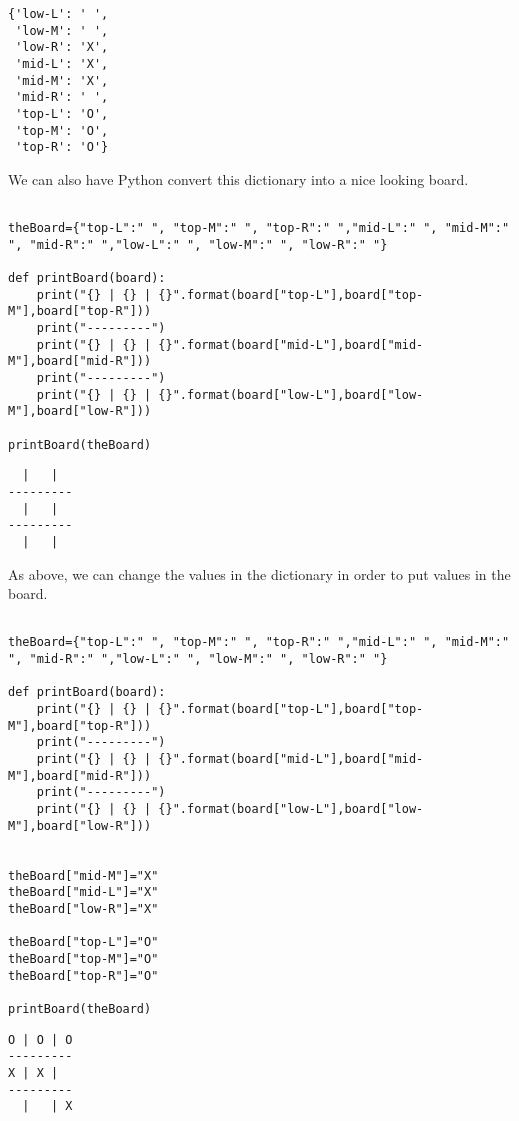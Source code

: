 \documentclass[11pt]{article}
\begin{document}
\begin{verbatim}
{'low-L': ' ',
 'low-M': ' ',
 'low-R': 'X',
 'mid-L': 'X',
 'mid-M': 'X',
 'mid-R': ' ',
 'top-L': 'O',
 'top-M': 'O',
 'top-R': 'O'}
\end{verbatim}


We can also have Python convert this dictionary into a nice looking board.


\begin{verbatim}

theBoard={"top-L":" ", "top-M":" ", "top-R":" ","mid-L":" ", "mid-M":" ", "mid-R":" ","low-L":" ", "low-M":" ", "low-R":" "}

def printBoard(board):
    print("{} | {} | {}".format(board["top-L"],board["top-M"],board["top-R"]))
    print("---------")
    print("{} | {} | {}".format(board["mid-L"],board["mid-M"],board["mid-R"]))
    print("---------")
    print("{} | {} | {}".format(board["low-L"],board["low-M"],board["low-R"]))

printBoard(theBoard)

\end{verbatim}

\begin{verbatim}
  |   |  
---------
  |   |  
---------
  |   |  
\end{verbatim}


As above, we can change the values in the dictionary in order to put values in the board.

\begin{verbatim}

theBoard={"top-L":" ", "top-M":" ", "top-R":" ","mid-L":" ", "mid-M":" ", "mid-R":" ","low-L":" ", "low-M":" ", "low-R":" "}

def printBoard(board):
    print("{} | {} | {}".format(board["top-L"],board["top-M"],board["top-R"]))
    print("---------")
    print("{} | {} | {}".format(board["mid-L"],board["mid-M"],board["mid-R"]))
    print("---------")
    print("{} | {} | {}".format(board["low-L"],board["low-M"],board["low-R"]))


theBoard["mid-M"]="X"
theBoard["mid-L"]="X"
theBoard["low-R"]="X"

theBoard["top-L"]="O"
theBoard["top-M"]="O"
theBoard["top-R"]="O"

printBoard(theBoard)

\end{verbatim}

\begin{verbatim}
O | O | O
---------
X | X |  
---------
  |   | X
\end{verbatim}
\end{document}

